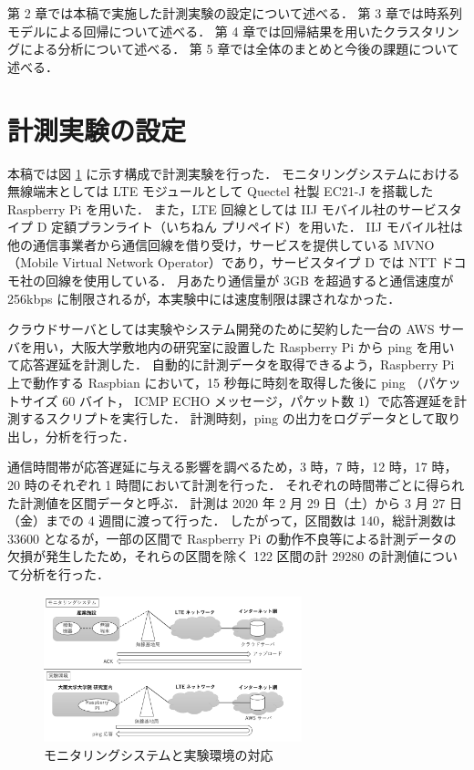 \documentclass[technicalreport]{ieicej}
\begin{document}
第 2 章では本稿で実施した計測実験の設定について述べる．
第 3 章では時系列モデルによる回帰について述べる．
第 4 章では回帰結果を用いたクラスタリングによる分析について述べる．
第 5 章では全体のまとめと今後の課題について述べる．
\section{計測実験の設定}
本稿では図 \ref{exp} に示す構成で計測実験を行った．
モニタリングシステムにおける無線端末としては LTE モジュールとして Quectel 社製 EC21-J を搭載した Raspberry Pi を用いた．
また，LTE 回線としては IIJ モバイル社のサービスタイプ D 定額プランライト（いちねん プリペイド）を用いた．
IIJ モバイル社は他の通信事業者から通信回線を借り受け，サービスを提供している MVNO（Mobile Virtual Network Operator）であり，サービスタイプ D では NTT ドコモ社の回線を使用している．
月あたり通信量が 3GB を超過すると通信速度が 256kbps に制限されるが，本実験中には速度制限は課されなかった．

クラウドサーバとしては実験やシステム開発のために契約した一台の AWS サーバを用い，大阪大学敷地内の研究室に設置した Raspberry Pi から ping を用いて応答遅延を計測した．
自動的に計測データを取得できるよう，Raspberry Pi 上で動作する Raspbian において，15 秒毎に時刻を取得した後に ping （パケットサイズ 60 バイト， ICMP ECHO メッセージ，パケット数 1）で応答遅延を計測するスクリプトを実行した．
計測時刻，ping の出力をログデータとして取り出し，分析を行った．

通信時間帯が応答遅延に与える影響を調べるため，3 時，7 時，12 時，17 時，20 時のそれぞれ 1 時間において計測を行った．
それぞれの時間帯ごとに得られた計測値を区間データと呼ぶ．
計測は 2020 年 2 月 29 日（土）から 3 月 27 日（金）までの 4 週間に渡って行った．
したがって，区間数は 140，総計測数は 33600 となるが，一部の区間で Raspberry Pi の動作不良等による計測データの欠損が発生したため，それらの区間を除く 122 区間の計 29280 の計測値について分析を行った．

\begin{figure}[tb]
\centering
\includegraphics[width=7.5cm]{experiment.pdf}
\caption{モニタリングシステムと実験環境の対応}
\label{exp}
\end{figure}
\end{document}
